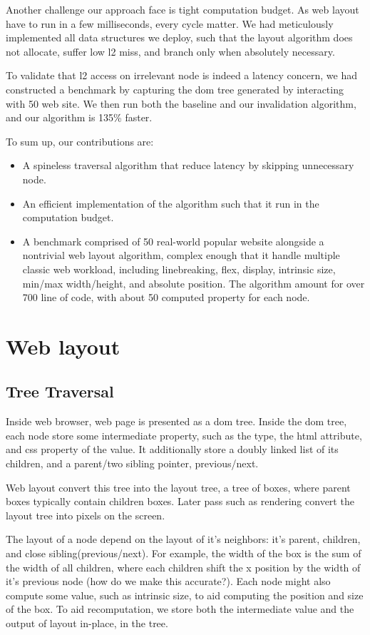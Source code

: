 \documentclass[format=acmsmall, review=false, screen=true]{acmart}
\begin{document}
Another challenge our approach face is tight computation budget. As web layout have to run in a few milliseconds, every cycle matter. We had meticulously implemented all data structures we deploy, such that the layout algorithm does not allocate, suffer low l2 miss, and branch only when absolutely necessary.

To validate that l2 access on irrelevant node is indeed a latency concern, we had constructed a benchmark by capturing the dom tree generated by interacting with 50 web site. We then run both the baseline and our invalidation algorithm, and our algorithm is 135\% faster.

To sum up, our contributions are:
\begin{itemize}
	\item A spineless traversal algorithm that reduce latency by skipping unnecessary node.
	\item An efficient implementation of the algorithm such that it run in the computation budget.
	\item A benchmark comprised of 50 real-world popular website alongside a nontrivial web layout algorithm, complex enough that it handle multiple classic web workload, including linebreaking, flex, display, intrinsic size, min/max width/height, and absolute position. The algorithm amount for over 700 line of code, with about 50 computed property for each node.
\end{itemize}

\section{Web layout}
\subsection{Tree Traversal}
Inside web browser, web page is presented as a dom tree. Inside the dom tree, each node store some intermediate property, such as the type, the html attribute, and css property of the value. It additionally store a doubly linked list of its children, and a parent/two sibling pointer, previous/next. 

Web layout convert this tree into the layout tree, a tree of boxes, where parent boxes typically contain children boxes. Later pass such as rendering convert the layout tree into pixels on the screen.

The layout of a node depend on the layout of it's neighbors: it's parent, children, and close sibling(previous/next). For example, the width of the box is the sum of the width of all children, where each children shift the x position by the width of it's previous node (how do we make this accurate?). Each node might also compute some value, such as intrinsic size, to aid computing the position and size of the box. To aid recomputation, we store both the intermediate value and the output of layout in-place, in the tree.
\end{document}
